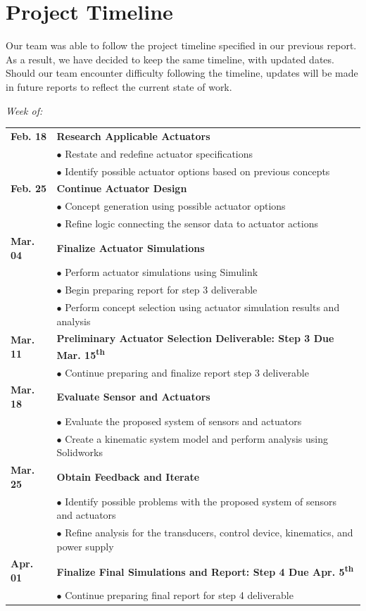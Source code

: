 \documentclass[12pt]{article}
\newcommand{\ts}{\textsuperscript}
\begin{document}
\section{Project Timeline}
Our team was able to follow the project timeline specified in our previous report. As a result, we have decided to keep the same timeline, with updated dates. Should our team encounter difficulty following the timeline, updates will be made in future reports to reflect the current state of work.\\
\begin{flushleft}
\pagebreak
\textit{Week of:}

\begin{tabular}{l | l} 
\textbf{Feb. 18} &\textbf{Research Applicable Actuators}\\
 & $\bullet$ Restate and redefine actuator specifications\\
  & $\bullet$ Identify possible actuator options based on previous concepts\\
  
\textbf{Feb. 25} & \textbf{Continue Actuator Design}\\
 & $\bullet$ Concept generation using possible actuator options\\
  & $\bullet$ Refine logic connecting the sensor data to actuator actions\\
  
\textbf{Mar. 04} & \textbf{Finalize Actuator Simulations}\\
 & $\bullet$ Perform actuator simulations using Simulink\\
 & $\bullet$ Begin preparing report for step 3 deliverable\\
 & $\bullet$ Perform concept selection using actuator simulation results and analysis\\
 
\textbf{Mar. 11} &\textbf{Preliminary Actuator Selection Deliverable: Step 3 Due Mar. 15\ts{th}}\\
 & $\bullet$ Continue preparing and finalize report step 3 deliverable\\
 
\textbf{Mar. 18} & \textbf{Evaluate Sensor and Actuators}\\
 & $\bullet$ Evaluate the proposed system of sensors and actuators\\
  & $\bullet$ Create a kinematic system model and perform analysis using Solidworks\\
  
\textbf{Mar. 25} & \textbf{Obtain Feedback and Iterate}\\
  & $\bullet$ Identify possible problems with the proposed system of sensors and actuators\\
  & $\bullet$ Refine analysis for the transducers, control device, kinematics, and power supply\\
  
\textbf{Apr. 01} & \textbf{Finalize Final Simulations and Report: Step 4 Due Apr. 5\ts{th}}\\
 & $\bullet$ Continue preparing final report for step 4 deliverable\\

\end{tabular}
\end{flushleft}
\end{document}
